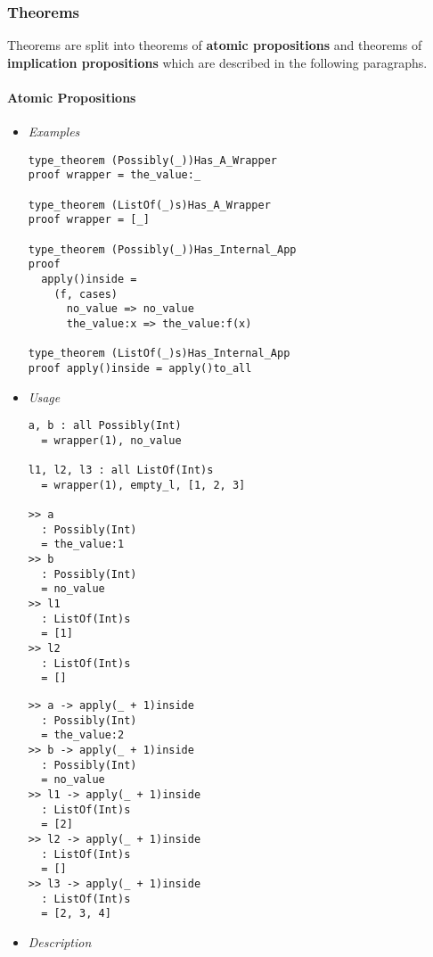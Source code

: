 \documentclass{article}
\begin{document}
\newpage

\subsubsection{Theorems}
\label{subsubsec:ttheo}

Theorems are split into theorems of \textbf{atomic propositions} and
theorems of \textbf{implication propositions} which are described in the
following paragraphs.

\paragraph{Atomic Propositions}

\begin{itemize}
\item \textit{Examples}

\begin{verbatim}
type_theorem (Possibly(_))Has_A_Wrapper
proof wrapper = the_value:_

type_theorem (ListOf(_)s)Has_A_Wrapper
proof wrapper = [_]

type_theorem (Possibly(_))Has_Internal_App
proof
  apply()inside =
    (f, cases)
      no_value => no_value
      the_value:x => the_value:f(x)

type_theorem (ListOf(_)s)Has_Internal_App
proof apply()inside = apply()to_all
\end{verbatim}

\item \textit{Usage}

\begin{verbatim} 
a, b : all Possibly(Int)
  = wrapper(1), no_value

l1, l2, l3 : all ListOf(Int)s
  = wrapper(1), empty_l, [1, 2, 3]

>> a
  : Possibly(Int)
  = the_value:1
>> b
  : Possibly(Int)
  = no_value
>> l1
  : ListOf(Int)s
  = [1]
>> l2
  : ListOf(Int)s
  = []
\end{verbatim}
\newpage
\begin{verbatim} 
>> a -> apply(_ + 1)inside
  : Possibly(Int)
  = the_value:2
>> b -> apply(_ + 1)inside
  : Possibly(Int)
  = no_value
>> l1 -> apply(_ + 1)inside
  : ListOf(Int)s
  = [2]
>> l2 -> apply(_ + 1)inside
  : ListOf(Int)s
  = []
>> l3 -> apply(_ + 1)inside
  : ListOf(Int)s
  = [2, 3, 4]
\end{verbatim}

\item \textit{Description}


\end{itemize}
\end{document}
